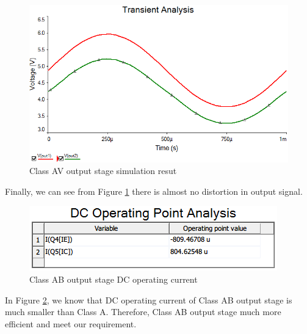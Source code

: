 \begin{figure}[htbp]
\centering
\includegraphics[scale=0.7 ]{"../Photo/Chap4/Class AB output stage simlation result"}
\caption{Class AV output stage simulation resut}
\label{fig:ClassABoutputstagesimlationresult}
\end{figure}

Finally, we can see from Figure \ref{fig:ClassABoutputstagesimlationresult} there is almost no distortion in output signal.

\begin{figure}[htbp]
\centering
\includegraphics[scale=1 ]{"../Photo/Chap4/Class AB output stage DC operatingh current data"}
\caption{Class AB output stage DC operating current}
\label{fig:ClassABoutputstageDCoperatinghcurrentdata}
\end{figure}

In Figure \ref{fig:ClassABoutputstageDCoperatinghcurrentdata}, we know that DC operating current of Class AB output stage is much smaller than Class A. Therefore, Class AB output stage much more efficient and meet our requirement.
